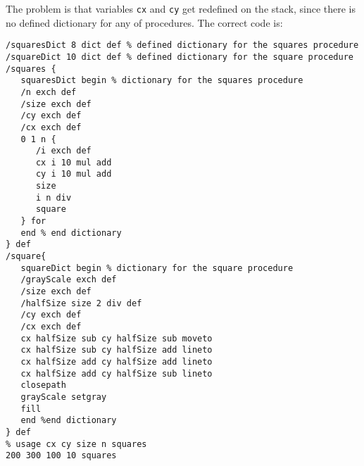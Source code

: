 The problem is that variables \texttt{cx} and \texttt{cy} get redefined on the stack, since there is no defined dictionary for any of procedures. The correct code is:
\begin{small}
\begin{verbatim}
/squaresDict 8 dict def % defined dictionary for the squares procedure
/squareDict 10 dict def % defined dictionary for the square procedure
/squares {
   squaresDict begin % dictionary for the squares procedure
   /n exch def
   /size exch def
   /cy exch def
   /cx exch def
   0 1 n {
      /i exch def
      cx i 10 mul add
      cy i 10 mul add
      size
      i n div
      square
   } for
   end % end dictionary
} def
/square{
   squareDict begin % dictionary for the square procedure
   /grayScale exch def
   /size exch def
   /halfSize size 2 div def
   /cy exch def
   /cx exch def
   cx halfSize sub cy halfSize sub moveto
   cx halfSize sub cy halfSize add lineto
   cx halfSize add cy halfSize add lineto
   cx halfSize add cy halfSize sub lineto
   closepath
   grayScale setgray
   fill
   end %end dictionary
} def
% usage cx cy size n squares
200 300 100 10 squares
\end{verbatim}
\end{small}